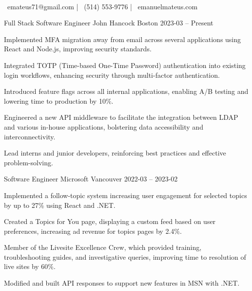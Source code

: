 \documentclass[]{awesome-cv}
\begin{document}
    
\begin{center}
	  \\
	\vspace{2mm}
	{\faEnvelope\ emateus71@gmail.com} | {\faMobile\ (514) 553-9776} | {\faLink\ emanuelmateus.com}
\end{center}
\begin{cventries}
	\cventry
	{Full Stack Software Engineer}
	{John Hancock}
	{Boston}
	{2023-03 – Present}
	{\begin{cvitems}
		\item {Implemented MFA migration away from email across several applications using React and Node.js, improving security standards.}
		\item {Integrated TOTP (Time-based One-Time Password) authentication into existing login workflows, enhancing security through multi-factor authentication.}
		\item {Introduced feature flags across all internal applications, enabling A/B testing and lowering time to production by 10\%.}
		\item {Engineered a new API middleware to facilitate the integration between LDAP and various in-house applications, bolstering data accessibility and interconnectivity.}
		\item {Lead interns and junior developers, reinforcing best practices and effective problem-solving.}
	\end{cvitems}}
	\cventry
	{Software Engineer}
	{Microsoft}
	{Vancouver}
	{2022-03 – 2023-02}
	{\begin{cvitems}
		\item {Implemented a follow-topic system increasing user engagement for selected topics by up to 27\% using React and .NET.}
		\item {Created a \textquotesingle{}Topics for You\textquotesingle{} page, displaying a custom feed based on user preferences, increasing ad revenue for topics pages by 2.4\%.}
		\item {Member of the Livesite Excellence Crew, which provided training, troubleshooting guides, and investigative queries, improving time to resolution of live sites by 60\%.}
		\item {Modified and built API responses to support new features in MSN with .NET.}

\end{cvitems}}
\end{cventries}
\end{document}
